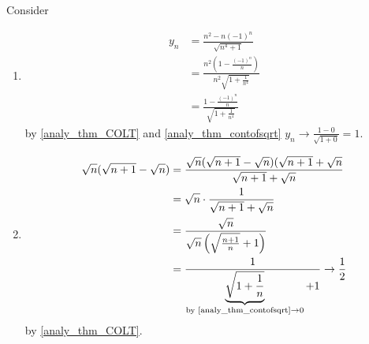 \documentclass[10pt, a4paper]{article}
\begin{document}
\begin{example}
    Consider
    \begin{enumerate}[label = (\alph*)]
        \item 
        \begin{align*}
            y_n &= \frac{n ^ 2 - n(-1) ^ n}{\sqrt{n ^ 4 + 1}} \\
            &= \frac{n ^ 2 \left(1 - \frac{(-1) ^ n}{n}\right)}{n ^ 2 \sqrt{1 + \frac{1}{n ^ 4}}} \\
            &= \frac{1 - \frac{(-1) ^ n}{n}}{\sqrt{1 + \frac{1}{n ^ 4}}}
        \end{align*}
        by \autoref{analy_thm_COLT} and \autoref{analy_thm_contofsqrt} $y_n \rightarrow \frac{1 - 0}{\sqrt{1 + 0}} = 1$.
        \item
        \begin{align*}
            \sqrt{n}(\sqrt{n + 1} - \sqrt{n}) &= \frac{\sqrt{n}(\sqrt{n + 1} - \sqrt{n})(\sqrt{n + 1} + \sqrt{n}}{\sqrt{n + 1} + \sqrt{n}} \\
            &= \sqrt{n} \cdot \frac{1}{\sqrt{n + 1} + \sqrt{n}} \\
            &= \frac{\sqrt{n}}{\sqrt{n}\left(\sqrt{\frac{n + 1}{n}} + 1\right)} \\
            &= \frac{1}{\underbrace{\sqrt{1 + \frac{1}{n}}}_{\text{by \autoref{analy_thm_contofsqrt}} \rightarrow 0} + 1} \rightarrow \frac{1}{2}
        \end{align*}
        by \autoref{analy_thm_COLT}.
    \end{enumerate}
\end{example}
\end{document}
